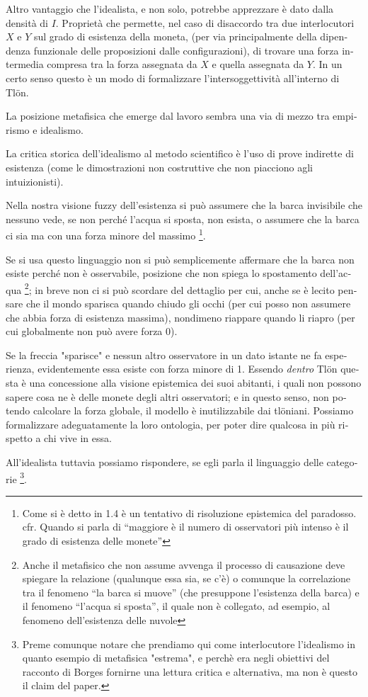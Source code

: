 \begin{italian}
Altro vantaggio che l'idealista, e non solo, potrebbe apprezzare è dato dalla densità di $I$. Proprietà che permette, nel caso di disaccordo tra due interlocutori $X$ e $Y$ sul grado di esistenza della moneta, (per via principalmente della dipendenza funzionale delle proposizioni dalle configurazioni), di trovare una forza intermedia compresa tra la forza assegnata da $X$ e quella assegnata da $Y$. In un certo senso questo è un modo di formalizzare l'intersoggettività all'interno di Tl\"on. 



La posizione metafisica che emerge dal lavoro sembra una via di mezzo tra empirismo e idealismo. 

La critica storica dell'idealismo al metodo scientifico è l'uso di prove indirette di esistenza (come le dimostrazioni non costruttive che non piacciono agli intuizionisti). 

Nella nostra visione fuzzy dell'esistenza si può assumere che la barca invisibile che nessuno vede, se non perché l'acqua si sposta, non esista, o assumere che la barca ci sia ma con una forza minore del massimo \footnote{Come si è detto in 1.4 è un tentativo di risoluzione epistemica del paradosso. cfr. Quando si parla di ``maggiore è il numero di osservatori più intenso è il grado di esistenza delle monete''}. 

Se si usa questo linguaggio non si può semplicemente affermare che la barca non esiste perché non è osservabile, posizione che non spiega lo spostamento dell'acqua \footnote{Anche il metafisico che non assume avvenga il processo di causazione deve spiegare la relazione (qualunque essa sia, se c'è) o comunque la correlazione tra il fenomeno ``la barca si muove'' (che presuppone l'esistenza della barca) e il fenomeno ``l'acqua si sposta'', il quale non è collegato, ad esempio, al fenomeno dell'esistenza delle nuvole}; in breve non ci si può scordare del dettaglio per cui, anche se è lecito pensare che il mondo sparisca quando chiudo gli occhi (per cui posso non assumere che abbia forza di esistenza massima), nondimeno riappare quando li riapro (per cui globalmente non può avere forza 0).

Se la freccia "sparisce" e nessun altro osservatore in un dato istante ne fa esperienza, evidentemente essa esiste con forza minore di 1. Essendo \emph{dentro} Tl\"on questa è una concessione alla visione epistemica dei suoi abitanti, i quali non possono sapere cosa ne è delle monete degli altri osservatori; e in questo senso, non potendo calcolare la forza globale, il modello è inutilizzabile dai tl\"oniani. Possiamo formalizzare adeguatamente la loro ontologia, per poter dire qualcosa in più rispetto a chi vive in essa. 

All'idealista tuttavia possiamo rispondere, se egli parla il linguaggio delle categorie \footnote{Preme comunque notare che prendiamo qui come interlocutore l'idealismo in quanto esempio di metafisica "estrema", e perchè era negli obiettivi del racconto di Borges fornirne una lettura critica e alternativa, ma non è questo il claim del paper. }.    

\end{italian}

